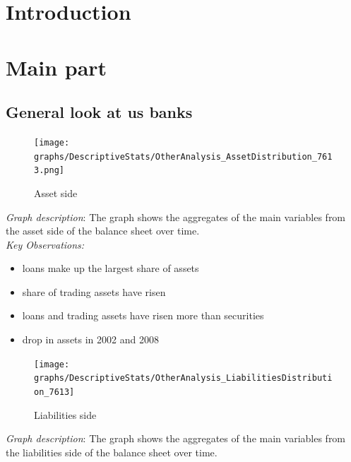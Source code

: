 \documentclass[12pt, a4paper]{article} %
\begin{document}
\tableofcontents
\newpage
{}




\section{Introduction}


\section{Main part}

\subsection{General look at us banks}



\begin{figure}[hbtp]
\centering
\caption{Asset side}
\texttt{[image: graphs/DescriptiveStats/OtherAnalysis\_AssetDistribution\_7613.png]}
\end{figure}

\noindent \textit{Graph description}: The graph shows the aggregates of the main variables from the asset side of the balance sheet over time.\\

\noindent \textit{Key Observations:}
\begin{itemize}
\item loans make up the largest share of assets
\item share of trading assets have risen
\item loans and trading assets have risen more than securities
\item drop in assets in 2002 and 2008
\end{itemize}

\newpage

\begin{figure}[hbtp]
\centering
\caption{Liabilities side}
\texttt{[image: graphs/DescriptiveStats/OtherAnalysis\_LiabilitiesDistribution\_7613]}
\end{figure}

\noindent \textit{Graph description}: The graph shows the aggregates of the main variables from the liabilities side of the balance sheet over time.\\
\end{document}
